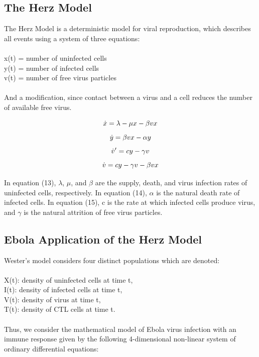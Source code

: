 \documentclass{article}
\begin{document}
\subsection{The Herz Model}
The Herz Model is a deterministic model for viral reproduction, which describes all events using a system of three equations:\\
\\
	x(t) = number of uninfected cells\\
	y(t) = number of infected cells\\
	v(t) = number of free virus particles\\
\\
And a modification, since contact between a virus and a cell reduces the number of available free virus.

\begin{equation}
		\dot x = \lambda - \mu x - \beta vx\\
\end{equation}
\begin{equation}
		\dot y = \beta vx - \alpha y\\
\end{equation}
\begin{equation}
		\dot v' = cy - \gamma v\\
\end{equation}
\begin{equation}
		\dot v = cy - \gamma v - \beta vx\\
\end{equation}

In equation (13), $\lambda$, $\mu$, and $\beta$ are the supply, death, and virus infection rates of uninfected cells, respectively.
In equation (14), $\alpha$ is the natural death rate of infected cells.
In equation (15), c is the rate at which infected cells produce virus, and $\gamma$ is the natural attrition of free virus particles.\\


\subsection{Ebola Application of the Herz Model}
Wester's model considers four distinct populations which are denoted:\\
\\
X(t): density of uninfected cells at time t,\\
I(t): density of infected cells at time t,\\
V(t): density of virus at time t,\\
T(t): density of CTL cells at time t.\\
\\
Thus, we consider the mathematical model of Ebola virus infection with an immune response given by the following 4-dimensional non-linear system of ordinary differential equations:
\end{document}

